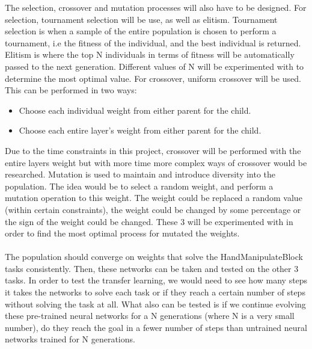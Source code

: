 The selection, crossover and mutation processes will also have to be designed. For selection, tournament selection will be use, as well as elitism. Tournament selection is when a sample of the entire population is chosen to perform a tournament, i.e the fitness of the individual, and the best individual is returned. Elitism is where the top N individuals in terms of fitness will be automatically passed to the next generation. Different values of N will be experimented with to determine the most optimal value. For crossover, uniform crossover will be used. This can be performed in two ways:
\begin{itemize}
  \item Choose each individual weight from either parent for the child.
  \item Choose each entire layer's weight from either parent for the child.
\end{itemize}
Due to the time constraints in this project, crossover will be performed with the entire layers weight but with more time more complex ways of crossover would be researched. Mutation is used to maintain and introduce diversity into the population. The idea would be to select a random weight, and perform a mutation operation to this weight. The weight could be replaced a random value (within certain constraints), the weight could be changed by some percentage or the sign of the weight could be changed. These 3 will be experimented with in order to find the most optimal process for mutated the weights.

\paragraph{}

The population should converge on weights that solve the HandManipulateBlock tasks consistently. Then, these networks can be taken and tested on the other 3 tasks. In order to test the transfer learning, we would need to see how many steps it takes the networks to solve each task or if they reach a certain number of steps without solving the task at all. What also can be tested is if we continue evolving these pre-trained neural networks for a N generations (where N is a very small number), do they reach the goal in a fewer number of steps than untrained neural networks trained for N generations.
